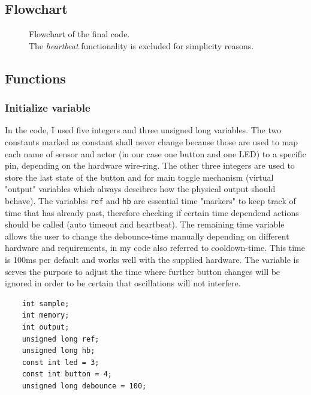 \documentclass{scrartcl}                    %
\begin{document}
\subsection{Flowchart}

    \begin{figure}[h]
        \centering
        
        \caption{Flowchart of the final code. \\ The \emph{heartbeat} functionality is excluded for simplicity reasons. \cite{flow}}
        \label{flowchart}
    \end{figure}

    
\subsection{Functions}
    \subsubsection{Initialize variable}
    In the code, I used five integers and three unsigned long variables. The two constants marked as constant shall never change because those are used to map each name of sensor and actor (in our case one button and one LED) to a specific pin, depending on the hardware wire-ring. The other three integers are used to store the last state of the button and for main toggle mechanism (virtual "output" variables which always descibres how the physical output should behave). The variables \texttt{ref} and \texttt{hb} are essential time "markers" to keep track of time that has already past, therefore checking if certain time dependend actions should be called (auto timeout and heartbeat). The remaining time variable allows the user to change the debounce-time manually depending on different hardware and requirements, in my code also referred to cooldown-time. This time is 100ms per default and works well with the supplied hardware. The variable is serves the purpose to adjust the time where further button changes will be ignored in order to be certain that oscillations will not interfere.
    \newpage
    
    \begin{lstlisting}
    int sample;                       
    int memory;                      
    int output;                      
    unsigned long ref;            
    unsigned long hb;
    const int led = 3;               
    const int button = 4;           
    unsigned long debounce = 100;    
    \end{lstlisting}
    
\end{document}
